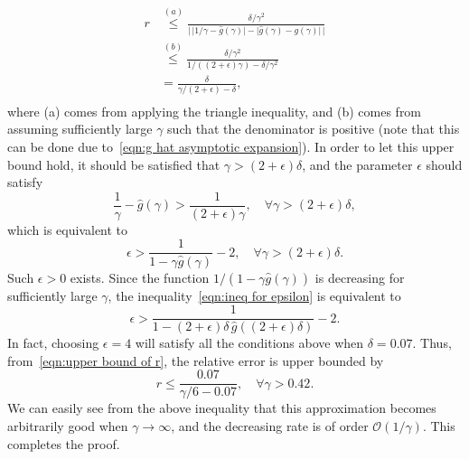 \documentclass[journal,twocolumn]{IEEEtran}
\theoremstyle{nonumberplain}
\begin{document}
    \begin{equation}
        \begin{aligned}
        r & \overset{(a)}{\leq} \frac{\delta/\gamma^2}{\lvert \,\lvert 1/\gamma - \hat{g}(\gamma)\rvert - \lvert \hat{g}(\gamma) -  g(\gamma)\rvert\,\rvert} \\
        & \overset{(b)}{\leq} \frac{\delta/\gamma^2}{1/((2+\epsilon)\gamma) - \delta/\gamma^2} \\
        & = \frac{\delta}{\gamma/(2+\epsilon) - \delta}, \\
        \end{aligned}
        \label{eqn:upper bound of r}
    \end{equation}
    where (a) comes from applying the triangle inequality, and (b) comes from assuming sufficiently large $\gamma$ such that the denominator is positive (note that this can be done due to~\eqref{eqn:g hat asymptotic expansion}).
    In order to let this upper bound hold, it should be satisfied that $\gamma > (2+\epsilon)\delta$, and the parameter $\epsilon$ should satisfy 
    \begin{equation}
        \frac{1}{\gamma} - \hat{g}(\gamma) > \frac{1}{(2+\epsilon)\gamma}, \quad\forall \gamma > (2+\epsilon)\delta,
    \end{equation}
    which is equivalent to 
    \begin{equation}
        \epsilon > \frac{1}{1-\gamma \hat{g}(\gamma)}-2,\quad \forall \gamma > (2+\epsilon)\delta.
        \label{eqn:ineq for epsilon}
    \end{equation}
    Such $\epsilon>0$ exists. Since the function $ 1/(1-\gamma \hat{g}(\gamma))$ is decreasing for sufficiently large $\gamma$, the inequality~\eqref{eqn:ineq for epsilon} is equivalent to 
    \begin{equation}
        \epsilon > \frac{1}{1-(2+\epsilon)\delta\, \hat{g}((2+\epsilon)\delta)}-2.
    \end{equation}
    In fact, choosing $\epsilon=4$ will satisfy all the conditions above when $\delta = 0.07$. Thus, from~\eqref{eqn:upper bound of r}, the relative error is upper bounded by 
    \begin{equation}
        r \leq \frac{0.07}{\gamma/6 - 0.07},\quad \forall \gamma > 0.42.
    \end{equation}
    We can easily see from the above inequality that this approximation becomes arbitrarily good when $\gamma\to\infty$, and the decreasing rate is of order $\mathcal{O}(1/\gamma)$. This completes the proof. 

\footnotesize


\end{document}
